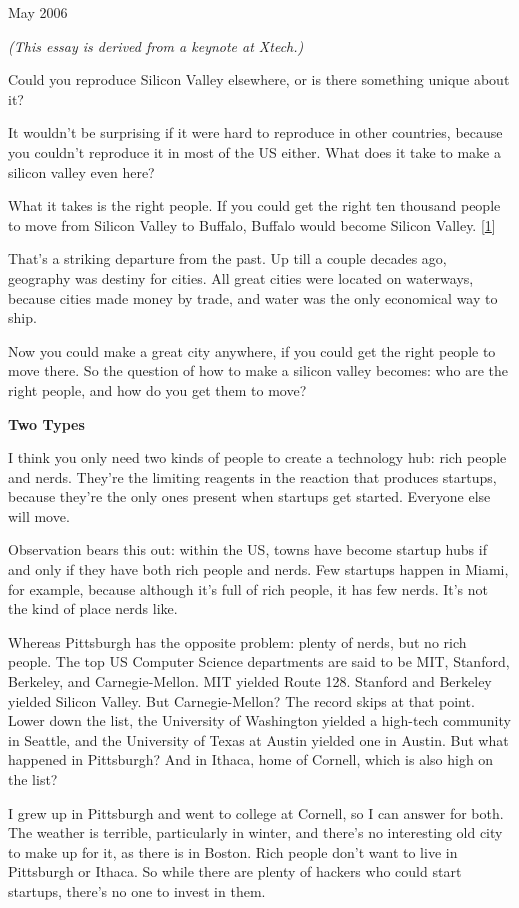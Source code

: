 May 2006

\emph{(This essay is derived from a keynote at Xtech.)}

Could you reproduce Silicon Valley elsewhere, or is there something
unique about it?

It wouldn't be surprising if it were hard to reproduce in other
countries, because you couldn't reproduce it in most of the US either.
What does it take to make a silicon valley even here?

What it takes is the right people. If you could get the right ten
thousand people to move from Silicon Valley to Buffalo, Buffalo would
become Silicon Valley. {[}\hyperref[f1n]{1}{]}

That's a striking departure from the past. Up till a couple decades ago,
geography was destiny for cities. All great cities were located on
waterways, because cities made money by trade, and water was the only
economical way to ship.

Now you could make a great city anywhere, if you could get the right
people to move there. So the question of how to make a silicon valley
becomes: who are the right people, and how do you get them to move?

\textbf{Two Types}

I think you only need two kinds of people to create a technology hub:
rich people and nerds. They're the limiting reagents in the reaction
that produces startups, because they're the only ones present when
startups get started. Everyone else will move.

Observation bears this out: within the US, towns have become startup
hubs if and only if they have both rich people and nerds. Few startups
happen in Miami, for example, because although it's full of rich people,
it has few nerds. It's not the kind of place nerds like.

Whereas Pittsburgh has the opposite problem: plenty of nerds, but no
rich people. The top US Computer Science departments are said to be MIT,
Stanford, Berkeley, and Carnegie-Mellon. MIT yielded Route 128. Stanford
and Berkeley yielded Silicon Valley. But Carnegie-Mellon? The record
skips at that point. Lower down the list, the University of Washington
yielded a high-tech community in Seattle, and the University of Texas at
Austin yielded one in Austin. But what happened in Pittsburgh? And in
Ithaca, home of Cornell, which is also high on the list?

I grew up in Pittsburgh and went to college at Cornell, so I can answer
for both. The weather is terrible, particularly in winter, and there's
no interesting old city to make up for it, as there is in Boston. Rich
people don't want to live in Pittsburgh or Ithaca. So while there are
plenty of hackers who could start startups, there's no one to invest in
them.

